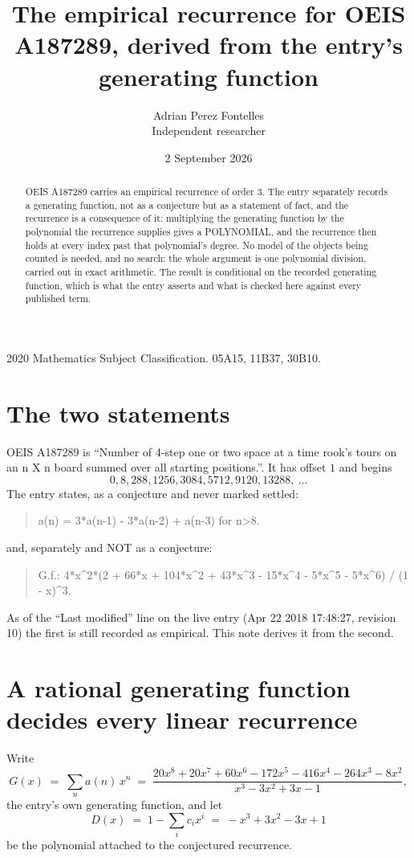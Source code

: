 \documentclass[11pt,a4paper]{article}
\title{The empirical recurrence for OEIS A187289, derived from the entry's generating function}
\author{Adrian Perez Fontelles\\ \small Independent researcher}
\date{2 September 2026}
\theoremstyle{plain}
\theoremstyle{definition}
\begin{document}
\maketitle

\begin{abstract}
OEIS A187289 carries an empirical recurrence of order $3$. The entry separately records a
generating function, not as a conjecture but as a statement of fact, and the recurrence is a
consequence of it: multiplying the generating function by the polynomial the recurrence
supplies gives a POLYNOMIAL, and the recurrence then holds at every index past that
polynomial's degree. No model of the objects being counted is needed, and no search: the
whole argument is one polynomial division, carried out in exact arithmetic. The result is
conditional on the recorded generating function, which is what the entry asserts and what is
checked here against every published term.
\end{abstract}

\noindent\small 2020 Mathematics Subject Classification. 05A15, 11B37, 30B10.\normalsize

\section{The two statements}

OEIS A187289 is ``Number of 4-step one or two space at a time rook's tours on an n X n board summed over all starting positions.''. It has offset $1$ and begins
\[
0, 8, 288, 1256, 3084, 5712, 9120, 13288,\ \dots
\]
The entry states, as a conjecture and never marked settled:
\begin{quote}
a(n) = 3*a(n-1) - 3*a(n-2) + a(n-3) for n>8.
\end{quote}
and, separately and NOT as a conjecture:
\begin{quote}
G.f.: 4*x\^{}2*(2 + 66*x + 104*x\^{}2 + 43*x\^{}3 - 15*x\^{}4 - 5*x\^{}5 - 5*x\^{}6) / (1 - x)\^{}3.
\end{quote}
As of the ``Last modified'' line on the live entry (Apr 22 2018 17:48:27, revision 10) the first is still
recorded as empirical. This note derives it from the second.

\section{A rational generating function decides every linear recurrence}

Write
\[
G(x)\;=\;\sum_{n}a(n)\,x^{n}\;=\;\frac{20 x^{8} + 20 x^{7} + 60 x^{6} - 172 x^{5} - 416 x^{4} - 264 x^{3} - 8 x^{2}}{x^{3} - 3 x^{2} + 3 x - 1},
\]
the entry's own generating function, and let
\[
D(x)\;=\;1-\sum_i c_i x^{i}\;=\;- x^{3} + 3 x^{2} - 3 x + 1
\]
be the polynomial attached to the conjectured recurrence.
\end{document}
